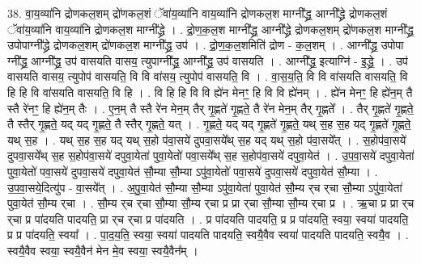 \documentclass[17pt]{extarticle}
\begin{document}
38. वा॒य॒व्या॑नि द्रोणकल॒शम् द्रो॑णकल॒शं ॅवा॑य॒व्या॑नि वाय॒व्या॑नि द्रोणकल॒श माग्नी᳚द्ध्र॒ आग्नी᳚द्ध्रे द्रोणकल॒शं ॅवा॑य॒व्या॑नि वाय॒व्या॑नि द्रोणकल॒श माग्नी᳚द्ध्रे । . द्रो॒ण॒क॒ल॒श माग्नी᳚द्ध्र॒ आग्नी᳚द्ध्रे द्रोणकल॒शम् द्रो॑णकल॒श माग्नी᳚द्ध्र॒ उपोपाग्नी᳚द्ध्रे द्रोणकल॒शम् द्रो॑णकल॒श माग्नी᳚द्ध्र॒ उप॑ । . द्रो॒ण॒क॒ल॒शमिति॑ द्रोण - क॒ल॒शम् । . आग्नी᳚द्ध्र॒ उपोपा ग्नी᳚द्ध्र॒ आग्नी᳚द्ध्र॒ उप॑ वासयति वासय॒ त्युपाग्नी᳚द्ध्र॒ आग्नी᳚द्ध्र॒ उप॑ वासयति । . आग्नी᳚द्ध्र॒ इत्याग्नि॑ - इ॒द्ध्रे॒ । . उप॑ वासयति वासय॒ त्युपोप॑ वासयति॒ वि वि वा॑सय॒ त्युपोप॑ वासयति॒ वि । . वा॒स॒य॒ति॒ वि वि वा॑सयति वासयति॒ वि हि हि वि वा॑सयति वासयति॒ वि हि । . वि हि हि वि वि ह्ये॑न मेनꣳ॒॒ हि वि वि ह्ये॑नम् । . ह्ये॑न मेनꣳ॒॒ हि ह्ये॑न॒म् तै स्तै रे॑नꣳ॒॒ हि ह्ये॑न॒म् तैः । . ए॒न॒म् तै स्तै रे॑न मेन॒म् तैर् गृ॒ह्णते॑ गृ॒ह्णते॒ तै रे॑न मेन॒म् तैर् गृ॒ह्णते᳚ । . तैर् गृ॒ह्णते॑ गृ॒ह्णते॒ तै स्तैर् गृ॒ह्णते॒ यद् यद् गृ॒ह्णते॒ तै स्तैर् गृ॒ह्णते॒ यत् । . गृ॒ह्णते॒ यद् यद् गृ॒ह्णते॑ गृ॒ह्णते॒ यथ् स॒ह स॒ह यद् गृ॒ह्णते॑ गृ॒ह्णते॒ यथ् स॒ह । . यथ् स॒ह स॒ह यद् यथ् स॒हो प॑वा॒सये॑ दुपवा॒सये᳚थ् स॒ह यद् यथ् स॒हो प॑वा॒सये᳚त् । . स॒होप॑वा॒सये॑ दुपवा॒सये᳚थ् स॒ह स॒होप॑वा॒सये॑ दपुवा॒येता॑ पुवा॒येतो॑ पवा॒सये᳚थ् स॒ह 
स॒होप॑वा॒सये॑ दपुवा॒येत॑ । . उ॒प॒वा॒सये॑ दपुवा॒येता॑ पुवा॒येतो॑ पवा॒सये॑ दुपवा॒सये॑ दपुवा॒येत॑ सौ॒म्या सौ॒म्या ऽपु॑वा॒येतो॑ पवा॒सये॑ दुपवा॒सये॑ दपुवा॒येत॑ सौ॒म्या । . उ॒प॒वा॒सये॒दित्यु॑प - वा॒सये᳚त् । . अ॒पु॒वा॒येत॑ सौ॒म्या सौ॒म्या ऽपु॑वा॒येता॑ पुवा॒येत॑ सौ॒म्य र्‌च र्‌चा सौ॒म्या ऽपु॑वा॒येता॑ पुवा॒येत॑ सौ॒म्य र्‌चा । . सौ॒म्य र्‌च र्‌चा सौ॒म्या सौ॒म्य र्‌चा प्र प्रा र्‌चा सौ॒म्या सौ॒म्य र्‌चा प्र । . ऋ॒चा प्र प्रा र्‌च र्‌चा प्र पा॑दयति पादयति॒ प्रा र्‌च र्‌चा प्र पा॑दयति । . प्र पा॑दयति पादयति॒ प्र प्र पा॑दयति॒ स्वया॒ स्वया॑ पादयति॒ प्र प्र पा॑दयति॒ स्वया᳚ । . पा॒द॒य॒ति॒ स्वया॒ स्वया॑ पादयति पादयति॒ स्वयै॒वैव स्वया॑ पादयति पादयति॒ स्वयै॒व । . स्वयै॒वैव स्वया॒ स्वयै॒वैन॑ मेन मे॒व स्वया॒ स्वयै॒वैन᳚म् । \newline
\pagebreak
{}
\end{document}
